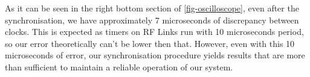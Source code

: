 As it can be seen in the right bottom section of \ref{fig-oscilloscope}, even after the synchronisation, we have approximately 7 microseconds of discrepancy between clocks. This is expected as timers on RF Links run with 10 microseconds period, so our error theoretically can't be lower then that. However, even with this 10 microseconds of error, our synchronisation procedure yields results that are more than sufficient to maintain a reliable operation of our system.  



                 

